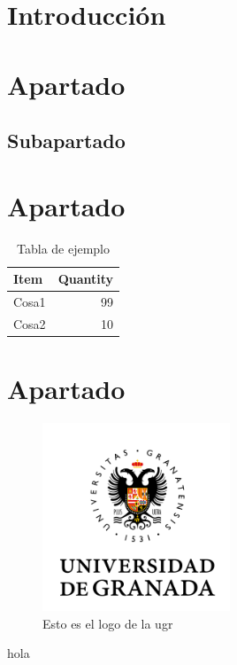 \documentclass[12pt, spanish]{article}
\begin{document}

\tableofcontents
\pagebreak


\section{Introducción}


\section{Apartado}
\subsection{Subapartado}
\section{Apartado}

\begin{table}[!htb]
\centering
\begin{tabular}{l|r}
Item & Quantity \\\hline
Cosa1 & 99 \\
Cosa2 & 10
\end{tabular}
\caption{\label{tab:widgets}Tabla de ejemplo}
\end{table}

\newpage

\section{Apartado}

\begin{figure}[!htb]
\centering
\includegraphics[width=0.5\textwidth]{ugr.png}
\caption{\label{fig:frog}Esto es el logo de la ugr}
\end{figure}

\newpage





hola


\end{document}
